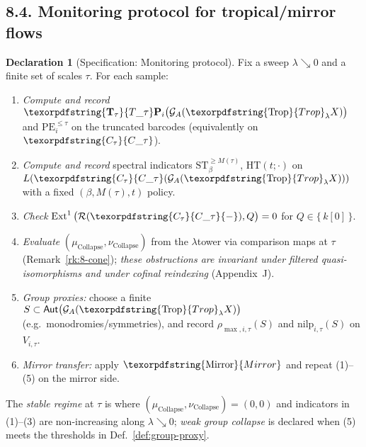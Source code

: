 \documentclass[11pt]{article}
\DeclareMathOperator{\Ext}{Ext}
\DeclareRobustCommand{\hyp}{\nobreakdash-}
\newcommand{\Rfun}{\mathcal{R}}
\numberwithin{equation}{section}
\theoremstyle{definition}
\newtheorem{declaration}[theorem]{Declaration}
\DeclareRobustCommand{\Ttau}{\texorpdfstring{\ensuremath{\mathbf{T}_{\tau}}}{T\_\tau}}
\DeclareRobustCommand{\Ctau}{\texorpdfstring{\ensuremath{C_{\tau}}}{C\_\tau}}
\DeclareRobustCommand{\Qtest}{\{\,k[0]\,\}}
\DeclareRobustCommand{\Trop}{\texorpdfstring{\ensuremath{\operatorname{Trop}}}{Trop}}
\DeclareRobustCommand{\Mirror}{\texorpdfstring{\ensuremath{\operatorname{Mirror}}}{Mirror}}
\begin{document}
\subsection*{8.4. Monitoring protocol for tropical/mirror flows}
\begin{declaration}[Specification: Monitoring protocol]\label{spec:prot}
Fix a sweep \(\lambda\searrow 0\) and a finite set of scales \(\tau\).
For each sample:
\begin{enumerate}
  \item \emph{Compute and record} \(\Ttau\mathbf{P}_i\big(\mathcal{G}_A(\Trop_\lambda X)\big)\) and \(\mathrm{PE}_i^{\le\tau}\) on the truncated barcodes (equivalently on \(\Ctau\)).
  \item \emph{Compute and record} spectral indicators \(\mathrm{ST}_{\beta}^{\ge M(\tau)}\), \(\mathrm{HT}(t;\cdot)\) on \(L(\Ctau(\mathcal{G}_A(\Trop_\lambda X)))\) with a fixed \((\beta,M(\tau),t)\) policy.
  \item \emph{Check} \(\Ext^1\big(\Rfun(\Ctau{-}),Q\big)=0\) for \(Q\in\Qtest\).
  \item \emph{Evaluate} \((\mu_{\mathrm{Collapse}},\nu_{\mathrm{Collapse}})\) from the \(\lambda\)\nobreakdash tower via comparison maps at \(\tau\) (Remark~\ref{rk:8-cone}); \emph{these obstructions are invariant under filtered quasi\hyp isomorphisms and under cofinal reindexing} (Appendix~J).
  \item \emph{Group proxies:} choose a finite \(S\subset\mathsf{Aut}\big(\mathcal{G}_A(\Trop_\lambda X)\big)\) (e.g.\ monodromies/symmetries), and record \(\rho_{\max,i,\tau}(S)\) and \(\mathrm{nilp}_{i,\tau}(S)\) on \(V_{i,\tau}\).
  \item \emph{Mirror transfer:} apply \(\Mirror\) and repeat (1)–(5) on the mirror side.
\end{enumerate}
The \emph{stable regime} at \(\tau\) is where \((\mu_{\mathrm{Collapse}},\nu_{\mathrm{Collapse}})=(0,0)\) and indicators in (1)–(3) are non\hyp increasing along \(\lambda\searrow 0\);
\emph{weak group collapse} is declared when (5) meets the thresholds in Def.~\ref{def:group-proxy}.
\end{declaration}
\end{document}
